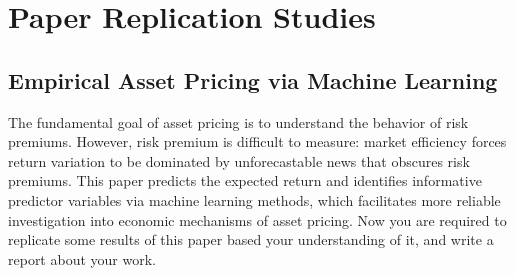\documentclass[11pt]{article}
\begin{document}

\section{Paper Replication Studies} 

\subsection{Empirical Asset Pricing via Machine Learning}

The fundamental goal of asset pricing is to understand the behavior of risk premiums. However, risk premium is difficult to measure: market efficiency forces return variation to be dominated by unforecastable news that obscures risk premiums. This paper predicts the expected return and identifies informative predictor variables via machine learning methods, which facilitates more reliable investigation into economic mechanisms of asset pricing. Now you are required to replicate some results of this paper based your understanding of it, and write a report about your work.
\end{document}
